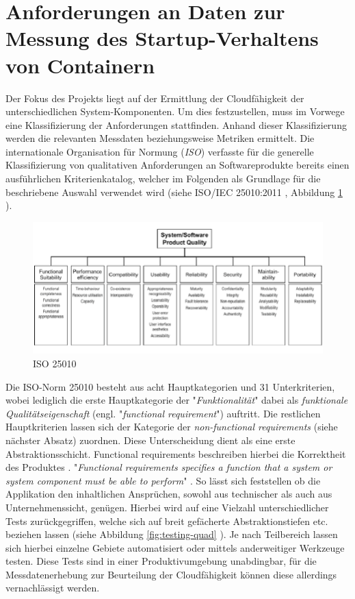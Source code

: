 \section{Anforderungen an Daten zur Messung des Startup-Verhaltens von Containern}
\label{sec:startupAnforderungen}

Der Fokus des Projekts liegt auf der Ermittlung der Cloudfähigkeit der unterschiedlichen System-Komponenten. Um dies festzustellen, muss im Vorwege eine Klassifizierung der Anforderungen stattfinden. Anhand dieser Klassifizierung werden die relevanten Messdaten beziehungsweise Metriken ermittelt. Die internationale Organisation für Normung (\emph{ISO}) verfasste für die generelle Klassifizierung von qualitativen Anforderungen an Softwareprodukte bereits einen ausführlichen Kriterienkatalog, welcher im Folgenden als Grundlage für die beschriebene Auswahl verwendet wird (siehe ISO/IEC 25010:2011 \cite{iso25010}, Abbildung \ref{fig:iso25010} ). 

\begin{figure}[ht!]
	\centering
	\includegraphics[width=\linewidth]{kapitel/vorgehensmodell/kriterienkatalog/_img/iso25010}
	\caption[iso25010]{ISO 25010 \cite{iso-img}}
	\label{fig:iso25010}
\end{figure}

Die ISO-Norm 25010 besteht aus acht Hauptkategorien und 31 Unterkriterien, wobei lediglich die erste Hauptkategorie der "\emph{Funktionalität}" dabei als \emph{funktionale Qualitätseigenschaft} (engl. "\emph{functional requirement}") auftritt. Die restlichen Hauptkriterien lassen sich der Kategorie der \emph{non-functional requirements} (siehe nächster Absatz) zuordnen. Diese Unterscheidung dient als eine erste Abstraktionsschicht. Functional requirements beschreiben hierbei die Korrektheit des Produktes \cite[Seite~335]{continuous-delivery}. "\emph{Functional requirements specifies a function that a system or system component must
be able to perform}" \cite[Seite~19]{eide-requirements}. So lässt sich feststellen ob die Applikation den inhaltlichen Ansprüchen, sowohl aus technischer als auch aus Unternehmenssicht, genügen. Hierbei wird auf eine Vielzahl unterschiedlicher Tests zurückgegriffen, welche sich auf breit gefächerte Abstraktionstiefen etc. beziehen lassen (siehe Abbildung \ref{fig:testing-quad} ). Je nach Teilbereich lassen sich hierbei einzelne Gebiete automatisiert oder mittels anderweitiger Werkzeuge testen. Diese Tests sind in einer Produktivumgebung unabdingbar, für die Messdatenerhebung zur Beurteilung der Cloudfähigkeit können diese allerdings vernachlässigt werden. 

